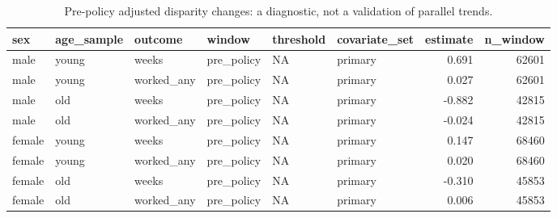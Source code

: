 \begin{table}

\caption{Pre-policy adjusted disparity changes: a diagnostic, not a validation of parallel trends.}
\centering
\begin{tabular}[t]{llllllrr}
\toprule
sex & age\_sample & outcome & window & threshold & covariate\_set & estimate & n\_window\\
\midrule
male & young & weeks & pre\_policy & NA & primary & 0.691 & 62601\\
male & young & worked\_any & pre\_policy & NA & primary & 0.027 & 62601\\
male & old & weeks & pre\_policy & NA & primary & -0.882 & 42815\\
male & old & worked\_any & pre\_policy & NA & primary & -0.024 & 42815\\
female & young & weeks & pre\_policy & NA & primary & 0.147 & 68460\\
\addlinespace
female & young & worked\_any & pre\_policy & NA & primary & 0.020 & 68460\\
female & old & weeks & pre\_policy & NA & primary & -0.310 & 45853\\
female & old & worked\_any & pre\_policy & NA & primary & 0.006 & 45853\\
\bottomrule
\end{tabular}
\end{table}
